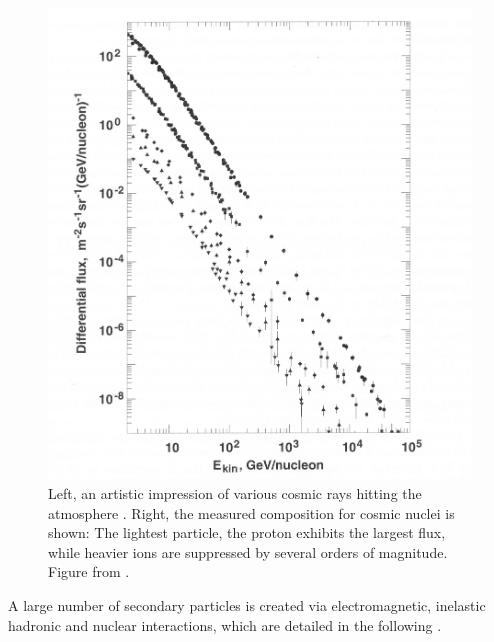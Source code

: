 \begin{figure}
\begin{minipage}[d]{0.49 \textwidth}
		  \includegraphics[width=\textwidth]{graphics/cosmicRays/energySpectrum.png}
	\end{minipage}
	\caption[Cosmic Ray Composition]{Left, an artistic impression of various cosmic rays hitting the atmosphere \cite{airShower}. Right, the measured composition for cosmic nuclei is shown: The lightest particle, the proton exhibits the largest flux, while heavier ions are suppressed by several orders of magnitude. Figure from \cite{highEnergyCosmicRays}.}
	\label{fig:Introduction:sec:CosmicRays}
    \end{figure}
    A large number of secondary particles is created via electromagnetic, inelastic hadronic and nuclear interactions, which are detailed in the following \cite{highEnergyCosmicRays, Grupen}. 
